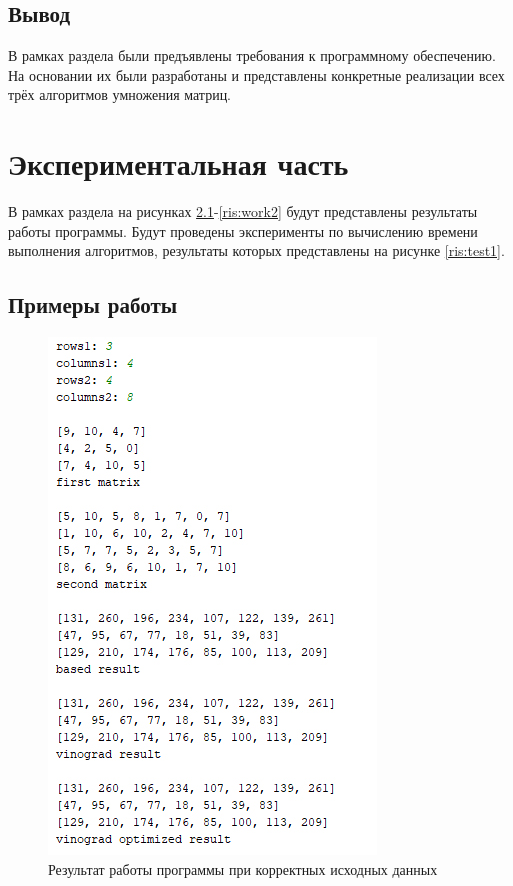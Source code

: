 \documentclass[a4paper,12pt]{report}
\begin{document}
    \section{Вывод}

        	В рамках раздела были предъявлены требования к программному обеспечению. 
        	На основании их были разработаны и представлены конкретные реализации всех трёх алгоритмов умножения матриц.

    \newpage

    \chapter{Экспериментальная часть}
        \label{sec:experimental_part}

        	В рамках раздела на рисунках \ref{ris:work1}-\ref{ris:work2} будут представлены результаты работы программы. 
        	Будут проведены эксперименты по вычислению времени выполнения алгоритмов, результаты которых представлены на рисунке \ref{ris:test1}.

	\section{Примеры работы}

        \begin{figure}[h!]
        	\centering
        	\includegraphics[width=0.5\linewidth]{test_mult1.jpg}
        	\caption{Результат работы программы при корректных исходных данных}
        	\label{ris:work1}
        \end{figure}
        
\end{document}
